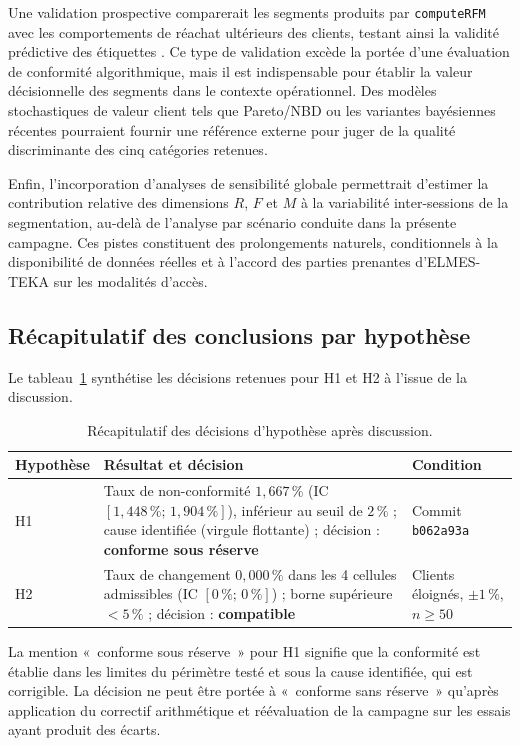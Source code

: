 Une validation prospective comparerait les segments produits par \texttt{computeRFM} avec
les comportements de réachat ultérieurs des clients, testant ainsi la validité prédictive des
étiquettes \citep{Fader2005}. Ce type de validation excède la portée d'une évaluation de
conformité algorithmique, mais il est indispensable pour établir la valeur décisionnelle des
segments dans le contexte opérationnel. Des modèles stochastiques de valeur client tels que
Pareto/NBD \citep{Fader2005} ou les variantes bayésiennes récentes pourraient fournir une
référence externe pour juger de la qualité discriminante des cinq catégories retenues.

Enfin, l'incorporation d'analyses de sensibilité globale \citep{Lakens2013} permettrait
d'estimer la contribution relative des dimensions $R$, $F$ et $M$ à la variabilité
inter-sessions de la segmentation, au-delà de l'analyse par scénario conduite dans la
présente campagne. Ces pistes constituent des prolongements naturels, conditionnels à la
disponibilité de données réelles et à l'accord des parties prenantes d'ELMES-TEKA sur les
modalités d'accès.

\subsection{Récapitulatif des conclusions par hypothèse}
\label{subsec:disc-recap}

Le tableau~\ref{tab:disc-recap} synthétise les décisions retenues pour H1 et H2 à l'issue
de la discussion.

\begin{table}[htb]
  \centering
  \caption{Récapitulatif des décisions d'hypothèse après discussion.}
  \label{tab:disc-recap}
  \begin{tabular}{lp{}l}
    \toprule
    Hypothèse & Résultat et décision & Condition \\
    \midrule
    H1 & Taux de non-conformité $1{,}667\,\%$ (IC $[1{,}448\,\% ;\, 1{,}904\,\%]$),
         inférieur au seuil de $2\,\%$ ; cause identifiée (virgule flottante) ;
         décision : \textbf{conforme sous réserve}
      & Commit \texttt{b062a93a} \\
    H2 & Taux de changement $0{,}000\,\%$ dans les 4 cellules admissibles (IC $[0\,\% ;\, 0\,\%]$) ;
         borne supérieure $< 5\,\%$ ; décision : \textbf{compatible}
      & Clients éloignés, $\pm1\,\%$, $n \ge 50$ \\
    \bottomrule
  \end{tabular}
\end{table}

La mention «~conforme sous réserve~» pour H1 signifie que la conformité est établie dans les
limites du périmètre testé et sous la cause identifiée, qui est corrigible. La décision ne
peut être portée à «~conforme sans réserve~» qu'après application du correctif arithmétique
et réévaluation de la campagne sur les essais ayant produit des écarts.
